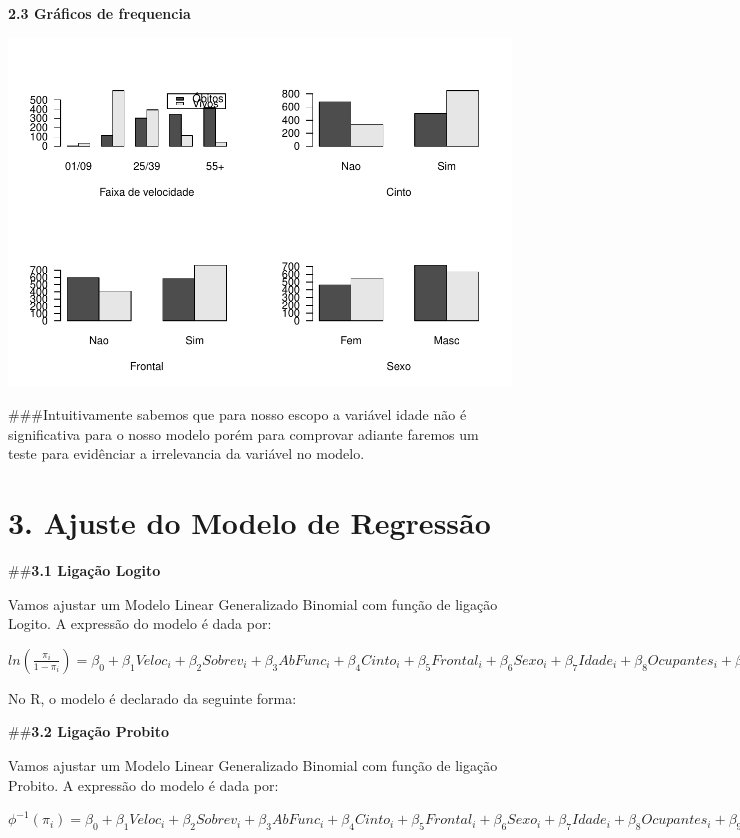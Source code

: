 \documentclass[]{article}
\begin{document}
\textbf{2.3 Gráficos de frequencia}

\includegraphics{Binarios_files/figure-latex/unnamed-chunk-8-1.pdf}

\#\#\#Intuitivamente sabemos que para nosso escopo a variável idade não
é significativa para o nosso modelo porém para comprovar adiante faremos
um teste para evidênciar a irrelevancia da variável no modelo.

\hypertarget{ajuste-do-modelo-de-regressao}{%
\section{3. Ajuste do Modelo de
Regressão}\label{ajuste-do-modelo-de-regressao}}

\#\#\textbf{3.1 Ligação Logito}

Vamos ajustar um Modelo Linear Generalizado Binomial com função de
ligação Logito. A expressão do modelo é dada por:

\(ln (\frac{\pi_i}{1-\pi_i}) = \beta_0 + \beta_1 Veloc_i + \beta_2 Sobrev_i + \beta_3 AbFunc_i + \beta_4 Cinto_i + \beta_5 Frontal_i + \beta_6 Sexo_i + \beta_7 Idade_i + \beta_8 Ocupantes_i + \beta_9 Grav_i\)

No R, o modelo é declarado da seguinte forma:

\#\#\textbf{3.2 Ligação Probito}

Vamos ajustar um Modelo Linear Generalizado Binomial com função de
ligação Probito. A expressão do modelo é dada por:

\(\phi^{-1} (\pi_i) = \beta_0 + \beta_1 Veloc_i + \beta_2 Sobrev_i + \beta_3 AbFunc_i + \beta_4 Cinto_i + \beta_5 Frontal_i + \beta_6 Sexo_i + \beta_7 Idade_i + \beta_8 Ocupantes_i + \beta_9 Grav_i\)
\end{document}
